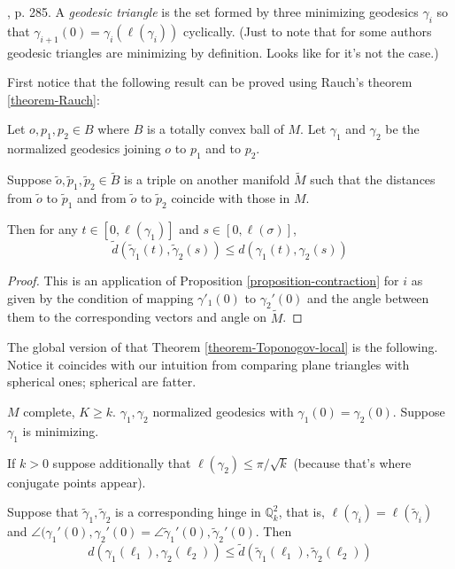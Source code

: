 \documentclass{book}
\begin{document}
\begin{definition}
\label{definition-geodesic-triangle}
\cite{doc}, p. 285. A {\it geodesic triangle}
is the set formed by three
minimizing geodesics $\gamma_i$ so that
$\gamma_{i+1}(0)=\gamma_i(\ell(\gamma_i))$
cyclically. (Just to note that for
some authors geodesic triangles are
minimizing by definition. Looks like for
\cite{meyers} it's not the case.)
\end{definition}

First notice that the following result can be
proved using Rauch's theorem
\ref{theorem-Rauch}:

\begin{theorem}
\label{theorem-Toponogov-local}
Let $o,p_1,p_2 \in B$ where $B$ is a totally
convex ball of $M$. Let $\gamma_1$
and $\gamma_2$ be the normalized geodesics
joining $o$ to $p_1$ and to $p_2$.

Suppose $\tilde{o}, \tilde{p}_1,\tilde{p}_2
\in \tilde{B}$ is a triple on
another manifold $\tilde{M}$ such that the
distances from $\tilde{o}$ to
$\tilde{p}_1$ and from $\tilde{o}$ to
$\tilde{p}_2$ coincide with those in $M$.

Then for any $t \in [0,\ell(\gamma_1)]$ and
$s \in [0,\ell(\sigma)]$,
$$
\tilde{d}(\tilde{\gamma}_1(t),\tilde{\gamma}
_2(s))\leq
d(\gamma_1(t),\gamma_2(s))
$$
\end{theorem}

\begin{proof}
This is an application of Proposition
\ref{proposition-contraction} for $i$ as
given by the condition of mapping
$\gamma'_1(0)$ to $\gamma_2'(0)$ and the
angle
between them to the corresponding vectors and
angle on $\tilde{M}$.
\end{proof}

The global version of that Theorem
\ref{theorem-Toponogov-local} is the
following. Notice it coincides with our
intuition from comparing plane triangles
with spherical ones; spherical are fatter.

\begin{theorem}
\label{theorem-Toponogov-hinge}
$M$ complete, $K \geq k$. $\gamma_1,\gamma_2$
normalized geodesics with
$\gamma_1(0)=\gamma_2(0)$. Suppose $\gamma_1$
is minimizing.

If $k>0$ suppose additionally that
$\ell(\gamma_2) \leq \pi/\sqrt{k}$ (because
that's where conjugate points appear).

Suppose that
$\tilde{\gamma}_1,\tilde{\gamma}_2$ is a
corresponding hinge in
$\mathbb{Q}_k^2$, that is,
$\ell(\gamma_i)=\ell(\tilde{\gamma}_i)$ and
$\angle(\gamma_1'(0),\gamma_2'(0)=
\angle\tilde{\gamma}_1'(0),\tilde{\gamma}
_2'(0)$.
Then
\begin{equation}
\label{equation-Toponogov-hinge1}
d(\gamma_1(\ell_1),\gamma_2(\ell_2)) \leq
\tilde{d}(\tilde{\gamma}_1(\ell_1),
\tilde{\gamma}_2(\ell_2))
\end{equation}
\end{theorem}
\end{document}
